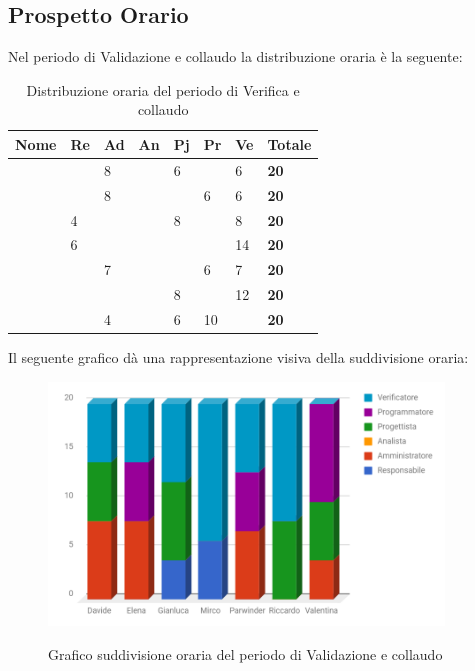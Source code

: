 \documentclass[PianoDiProgetto.tex]{subfiles}
\begin{document}
\subsection{Prospetto Orario}
Nel periodo di Validazione e collaudo la distribuzione oraria è la seguente:
\begin{center}
	\begin{table}[htbp]
		\centering
		\renewcommand\arraystretch{1.5}
		\begin{tabularx}{\textwidth}{p{4cm}|p{1cm}|p{1cm}|p{1cm}|p{1cm}|p{1cm}|p{1cm}|p{2cm}}
			\hline
			\textbf{Nome} & \textbf{Re} & \textbf{Ad} & \textbf{An} & \textbf{Pj} & \textbf{Pr} & \textbf{Ve} & \textbf{Totale} \\
			\hline
			\Davide & \ & 8 & \ & 6 & \ & 6 & \textbf{20} \\
			\hline
			\Elena & \ & 8 & \ & \ & 6 & 6 & \textbf{20} \\
			\hline
			\Gianluca & 4 & \ & \ & 8 & \ & 8 & \textbf{20} \\
			\hline
			\Mirco & 6 & \ & \ & \ & \ & 14 & \textbf{20} \\
			\hline
			\Parwinder & \ & 7 & \ & \ & 6 & 7 & \textbf{20} \\
			\hline
			\Riccardo & \ & \ & \ & 8 & \ & 12 & \textbf{20} \\
			\hline
			\Valentina & \ & 4 & \ & 6 & 10 & \ & \textbf{20} \\
			\hline
		\end{tabularx}
	\caption{Distribuzione oraria del periodo di Verifica e collaudo}
	\label{my-label}
	\end{table} 	
\end{center}
Il seguente grafico dà una rappresentazione visiva della suddivisione oraria:
\begin{figure}[h]
	\centering
	\includegraphics[width=10.5cm]{images/prospettoOrario/valCol.png}
	\label{fig:foo}
	\caption{Grafico suddivisione oraria del periodo di Validazione e collaudo}
\end{figure} 
\newpage
\end{document}
